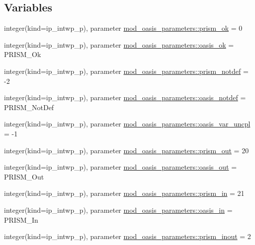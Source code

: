 \subsection*{Variables}
\begin{DoxyCompactItemize}
\item 
integer(kind=ip\+\_\+intwp\+\_\+p), parameter \hyperlink{namespacemod__oasis__parameters_aa7cbeb1a099f571702827ace878cdc64}{mod\+\_\+oasis\+\_\+parameters\+::prism\+\_\+ok} = 0
\item 
integer(kind=ip\+\_\+intwp\+\_\+p), parameter \hyperlink{namespacemod__oasis__parameters_a3ea125963822918ce37fd3cfd9658c9f}{mod\+\_\+oasis\+\_\+parameters\+::oasis\+\_\+ok} = P\+R\+I\+S\+M\+\_\+\+Ok
\item 
integer(kind=ip\+\_\+intwp\+\_\+p), parameter \hyperlink{namespacemod__oasis__parameters_aa388f517f0a947f770637d617bdda79b}{mod\+\_\+oasis\+\_\+parameters\+::prism\+\_\+notdef} = -\/2
\item 
integer(kind=ip\+\_\+intwp\+\_\+p), parameter \hyperlink{namespacemod__oasis__parameters_acbe396fd3b5e7b00dd66425f0acb546d}{mod\+\_\+oasis\+\_\+parameters\+::oasis\+\_\+notdef} = P\+R\+I\+S\+M\+\_\+\+Not\+Def
\item 
integer(kind=ip\+\_\+intwp\+\_\+p), parameter \hyperlink{namespacemod__oasis__parameters_ac906e1466e6cdc300a0b582af6619ca5}{mod\+\_\+oasis\+\_\+parameters\+::oasis\+\_\+var\+\_\+uncpl} = -\/1
\item 
integer(kind=ip\+\_\+intwp\+\_\+p), parameter \hyperlink{namespacemod__oasis__parameters_a58d4e90d13e758e6a6dfab01e6a1415e}{mod\+\_\+oasis\+\_\+parameters\+::prism\+\_\+out} = 20
\item 
integer(kind=ip\+\_\+intwp\+\_\+p), parameter \hyperlink{namespacemod__oasis__parameters_a76a150fa8ef6ed0b35183e627d757439}{mod\+\_\+oasis\+\_\+parameters\+::oasis\+\_\+out} = P\+R\+I\+S\+M\+\_\+\+Out
\item 
integer(kind=ip\+\_\+intwp\+\_\+p), parameter \hyperlink{namespacemod__oasis__parameters_a9cd491b86da0ba4612f2de5a9ef52e7c}{mod\+\_\+oasis\+\_\+parameters\+::prism\+\_\+in} = 21
\item 
integer(kind=ip\+\_\+intwp\+\_\+p), parameter \hyperlink{namespacemod__oasis__parameters_a16809ad581bb609aa5b0661927478653}{mod\+\_\+oasis\+\_\+parameters\+::oasis\+\_\+in} = P\+R\+I\+S\+M\+\_\+\+In
\item 
integer(kind=ip\+\_\+intwp\+\_\+p), parameter \hyperlink{namespacemod__oasis__parameters_ae8105d0074bcd93e7da5c40331d2b9fe}{mod\+\_\+oasis\+\_\+parameters\+::prism\+\_\+inout} = 2

\end{DoxyCompactItemize}
